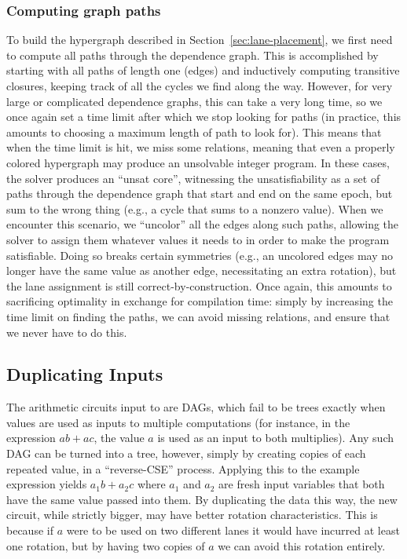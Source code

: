 \subsubsection*{Computing graph paths}\label{sec:computing-graph-paths}
To build the hypergraph described in Section~\ref{sec:lane-placement}, we first need to compute all paths through the dependence graph.
This is accomplished by starting with all paths of length one (edges) and inductively computing transitive closures, keeping track of all the cycles we find along the way.
However, for very large or complicated dependence graphs, this can take a very long time, so we once again set a time limit after which we stop looking for paths (in practice, this amounts to choosing a maximum length of path to look for).
This means that when the time limit is hit, we miss some relations, meaning that even a properly colored hypergraph may produce an unsolvable integer program.
In these cases, the solver produces an ``unsat core'', witnessing the unsatisfiability as a set of paths through the dependence graph that start and end on the same epoch, but sum to the wrong thing (e.g., a cycle that sums to a nonzero value).
When we encounter this scenario, we ``uncolor'' all the edges along such paths, allowing the solver to assign them whatever values it needs to in order to make the program satisfiable.
Doing so breaks certain symmetries (e.g., an uncolored edges may no longer have the same value as another edge, necessitating an extra rotation), but the lane assignment is still correct-by-construction.
Once again, this amounts to sacrificing optimality in exchange for compilation time: simply by increasing the time limit on finding the paths, we can avoid missing relations, and ensure that we never have to do this.

\subsection{Duplicating Inputs}\label{sec:duplicating-inputs}
The arithmetic circuits input to \system are DAGs, which fail to be trees exactly when values are used as inputs to multiple computations (for instance, in the expression $ab + ac$, the value $a$ is used as an input to both multiplies).
Any such DAG can be turned into a tree, however, simply by creating copies of each repeated value, in a ``reverse-CSE'' process.
Applying this to the example expression yields $a_1b + a_2c$ where $a_1$ and $a_2$ are fresh input variables that both have the same value passed into them.
By duplicating the data this way, the new circuit, while strictly bigger, may have better rotation characteristics.
This is because if $a$ were to be used on two different lanes it would have incurred at least one rotation, but by having two copies of $a$ we can avoid this rotation entirely.

